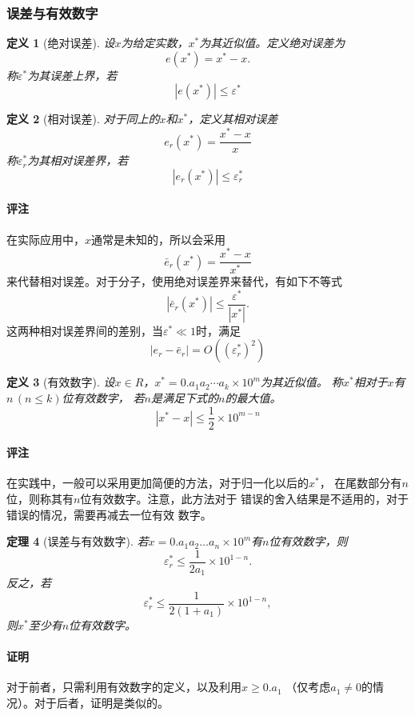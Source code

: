 \documentclass[12pt, a4paper]{article}
\theoremstyle{margin}
\newtheorem{thm}{定理}
\newtheorem{defi}[thm]{定义}
\newcommand{\vep}{\varepsilon}
\newcommand{\aoneton}{a_1a_2\dots a_n}
\newcommand{\remark}{\paragraph{评注}}
\newcommand{\proof}{\paragraph{证明}}
\begin{document}
\subsubsection{误差与有效数字}
  \begin{defi}[绝对误差]
    设$x$为给定实数，$x^*$为其近似值。定义绝对误差为
    \[
      e(x^*) = x^* - x.
    \]
    称$\varepsilon^*$为其误差上界，若
    \[
      |e(x^*)| \le \varepsilon^*
    \]
  \end{defi}

  \begin{defi}[相对误差]
    对于同上的$x$和$x^*$，定义其相对误差
    \[
      e_r(x^*)=\frac{x^* - x}{x}
    \]
    称$\varepsilon_r^*$为其相对误差界，若
    \[
      |e_r(x^*)|\le\varepsilon_r^*
    \]
  \end{defi}
  \remark
    在实际应用中，$x$通常是未知的，所以会采用
    \[
      \bar{e}_r(x^*)=\frac{x^*-x}{x^*}
    \]
    来代替相对误差。对于分子，使用绝对误差界来替代，有如下不等式
    \[
      |\bar{e}_r(x^*)| \le \frac{\varepsilon^*}{|x^*|}.
    \]
    这两种相对误差界间的差别，当$\varepsilon^*\ll 1$时，满足
    \[
      |e_r-\bar{e}_r|=O((\varepsilon_r^*)^2)
    \]

  \begin{defi}[有效数字]
    设$x\in R$，$x^*=0.a_1a_2\cdots a_k\times 10^m$为其近似值。
    称$x^*$相对于$x$有$n\,(n\le k)$位有效数字，
    若$n$是满足下式的$n$的最大值。
    \[
      |x^* - x| \le \frac{1}{2} \times 10^{m - n}
    \]
  \end{defi}
  \remark
    在实践中，一般可以采用更加简便的方法，对于归一化以后的$x^*$，
    在尾数部分有$n$位，则称其有$n$位有效数字。注意，此方法对于
    错误的舍入结果是不适用的，对于错误的情况，需要再减去一位有效
    数字。

  \begin{thm}[误差与有效数字]
    若$x=0.\aoneton\times10^m$有$n$位有效数字，则
    \[
      \vep^*_r \le
      \frac{1}{2a_1}\times10^{1-n}.
    \]
    反之，若
    \[
      \vep^*_r \le
      \frac{1}{2(1+a_1)}\times 10^{1-n},
    \]
    则$x^*$至少有$n$位有效数字。
  \end{thm}
  \proof
    对于前者，只需利用有效数字的定义，以及利用$x\ge 0.a_1$
    （仅考虑$a_1\ne0$的情况）。对于后者，证明是类似的。
\end{document}
